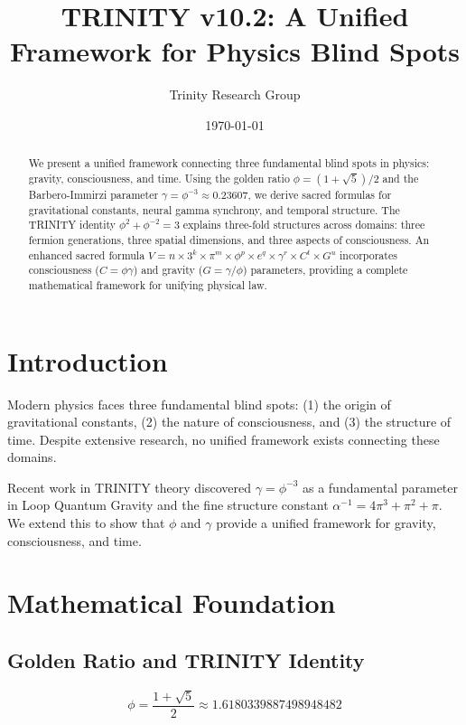 \documentclass[12pt,a4paper]{article}
\title{TRINITY v10.2: A Unified Framework for Physics Blind Spots}
\author{Trinity Research Group}
\date{\today}
\begin{document}
\maketitle

\begin{abstract}
We present a unified framework connecting three fundamental blind spots in physics: gravity, consciousness, and time. Using the golden ratio $\phi = (1+\sqrt{5})/2$ and the Barbero-Immirzi parameter $\gamma = \phi^{-3} \approx 0.23607$, we derive sacred formulas for gravitational constants, neural gamma synchrony, and temporal structure. The TRINITY identity $\phi^2 + \phi^{-2} = 3$ explains three-fold structures across domains: three fermion generations, three spatial dimensions, and three aspects of consciousness. An enhanced sacred formula $V = n \times 3^k \times \pi^m \times \phi^p \times e^q \times \gamma^r \times C^t \times G^u$ incorporates consciousness ($C = \phi\gamma$) and gravity ($G = \gamma/\phi$) parameters, providing a complete mathematical framework for unifying physical law.
\end{abstract}

\section{Introduction}

Modern physics faces three fundamental blind spots: (1) the origin of gravitational constants, (2) the nature of consciousness, and (3) the structure of time. Despite extensive research, no unified framework exists connecting these domains.

Recent work in TRINITY theory discovered $\gamma = \phi^{-3}$ as a fundamental parameter in Loop Quantum Gravity and the fine structure constant $\alpha^{-1} = 4\pi^3 + \pi^2 + \pi$. We extend this to show that $\phi$ and $\gamma$ provide a unified framework for gravity, consciousness, and time.

\section{Mathematical Foundation}

\subsection{Golden Ratio and TRINITY Identity}

\begin{equation}
\phi = \frac{1 + \sqrt{5}}{2} \approx 1.6180339887498948482
\end{equation}
\end{document}
